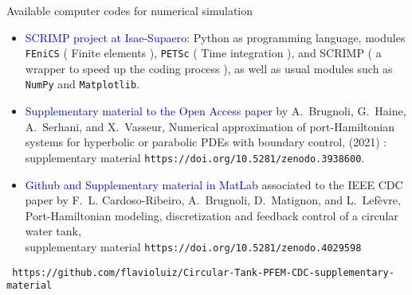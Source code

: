 \documentclass[10pt,aspectratio=43]{ISAE-Beamer}
\newcommand{\blue}[1]{\textcolor{blue}{#1}}
\begin{document}
\begin{frame}{\small Available computer codes for numerical simulation}

  \begin{itemize}
  \item \blue{SCRIMP project at Isae-Supaero}: Python as programming language, modules \texttt{FEniCS} ( Finite elements ), \texttt{PETSc} ( Time integration ), and SCRIMP ( a  wrapper to speed up the coding process ), as well as usual modules such as \texttt{NumPy} and \texttt{Matplotlib}.
  \item \blue{Supplementary material to the Open Access paper} by {\sc A.~Brugnoli, G.~Haine, A.~Serhani, and X.~Vasseur}, Numerical
  approximation of port-{H}amiltonian systems for hyperbolic or parabolic
  {PDEs} with boundary control,  (2021) :\\
supplementary material {\tt https://doi.org/10.5281/zenodo.3938600}.

    \item \blue{Github and Supplementary material in MatLab} associated to the IEEE CDC paper by {\sc F.~L. Cardoso-Ribeiro, A.~Brugnoli, D.~Matignon, and L.~Lef\`{e}vre}, 
  Port-{H}amiltonian modeling, discretization and feedback control of a
  circular water tank, \\
  supplementary material {\tt https://doi.org/10.5281/zenodo.4029598}
  \end{itemize}
          {\small {\tt
              https://github.com/flavioluiz/Circular-Tank-PFEM-CDC-supplementary-material}}


\end{frame}

\end{document}
